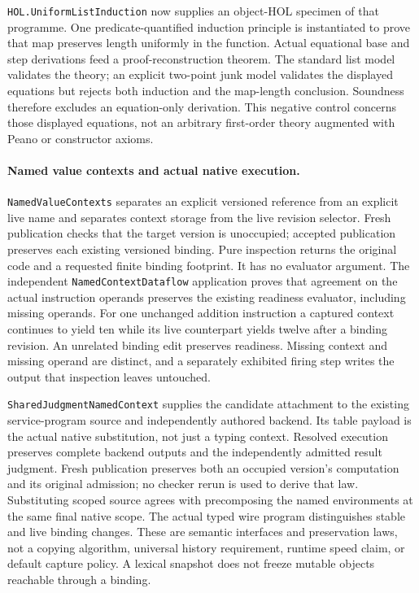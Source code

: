 \documentclass[11pt]{article}
\theoremstyle{definition}
\theoremstyle{remark}
\begin{document}
\texttt{HOL.UniformListInduction} now supplies an object-HOL specimen of that
programme. One predicate-quantified induction principle is instantiated to
prove that map preserves length uniformly in the function. Actual equational
base and step derivations feed a proof-reconstruction theorem. The standard
list model validates the theory; an explicit two-point junk model validates
the displayed equations but rejects both induction and the map-length
conclusion. Soundness therefore excludes an equation-only derivation. This
negative control concerns those displayed equations, not an arbitrary
first-order theory augmented with Peano or constructor axioms.

\paragraph{Named value contexts and actual native execution.}
\texttt{NamedValueContexts} separates an explicit versioned reference from
an explicit live name and separates context storage from the live revision
selector. Fresh publication checks that the target version is unoccupied;
accepted publication preserves each existing versioned binding. Pure
inspection returns the original code and a requested finite binding
footprint. It has no evaluator argument. The independent
\texttt{NamedContextDataflow} application proves that agreement on the actual
instruction operands preserves the existing readiness evaluator, including
missing operands. For one unchanged addition instruction a captured context
continues to yield ten while its live counterpart yields twelve after a
binding revision. An unrelated binding edit preserves readiness. Missing
context and missing operand are distinct, and a separately exhibited firing
step writes the output that inspection leaves untouched.

\texttt{SharedJudgmentNamedContext} supplies the candidate attachment to
the existing service-program source and independently authored backend. Its
table payload is the actual native substitution, not just a typing context.
Resolved execution preserves complete backend outputs and the independently
admitted result judgment. Fresh publication preserves both an occupied
version's computation and its original admission; no checker rerun is used
to derive that law. Substituting scoped source agrees with precomposing the
named environments at the same final native scope. The actual typed wire
program distinguishes stable and live binding changes. These are semantic
interfaces and preservation laws, not a copying algorithm, universal history
requirement, runtime speed claim, or default capture policy. A lexical
snapshot does not freeze mutable objects reachable through a binding.
\end{document}

